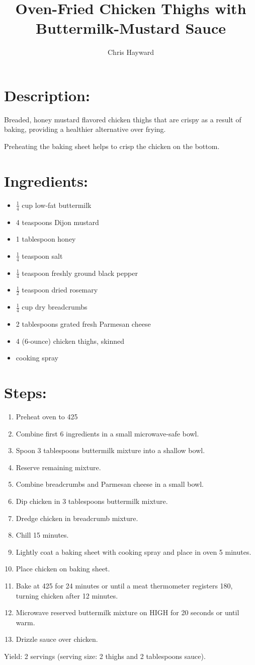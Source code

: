 \documentclass{article}
\title{Oven-Fried Chicken Thighs with Buttermilk-Mustard Sauce}
\author{Chris Hayward}
\begin{document}
\maketitle

\section{Description:}
Breaded, honey mustard flavored chicken thighs that are crispy as a result of baking, providing a healthier alternative over frying.

\noindent Preheating the baking sheet helps to crisp the chicken on the bottom.

\section{Ingredients:}
\begin{itemize}
\item$\frac{1}{4}$ cup low-fat buttermilk
\item 4 teaspoons Dijon mustard
\item 1 tablespoon honey
\item$\frac{1}{4}$ teaspoon salt
\item$\frac{1}{4}$ teaspoon freshly ground black pepper
\item$\frac{1}{2}$ teaspoon dried rosemary
\item$\frac{1}{4}$ cup dry breadcrumbs
\item 2 tablespoons grated fresh Parmesan cheese
\item 4 (6-ounce) chicken thighs, skinned
\item cooking spray
\end{itemize}

\section{Steps:}
\begin{enumerate}
\item Preheat oven to 425
\item Combine first 6 ingredients in a small microwave-safe bowl.
\item Spoon 3 tablespoons buttermilk mixture into a shallow bowl.
\item Reserve remaining mixture.
\item Combine breadcrumbs and Parmesan cheese in a small bowl.
\item Dip chicken in 3 tablespoons buttermilk mixture.
\item Dredge chicken in breadcrumb mixture.
\item Chill 15 minutes.
\item Lightly coat a baking sheet with cooking spray and place in oven 5 minutes.
\item Place chicken on baking sheet.
\item Bake at 425 for 24 minutes or until a meat thermometer registers 180, turning chicken after 12 minutes.
\item Microwave reserved buttermilk mixture on HIGH for 20 seconds or until warm.
\item Drizzle sauce over chicken.
\end{enumerate}

Yield: 2 servings (serving size: 2 thighs and 2 tablespoons sauce).
\end{document}
